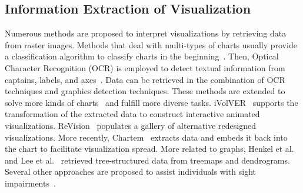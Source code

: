\subsection{Information Extraction of Visualization}
Numerous methods are proposed to interpret visualizations by retrieving data from raster images.
Methods that deal with multi-types of charts usually provide a classification algorithm to classify charts in the beginning~\cite{DBLP:conf/icip/GaoZB12, DBLP:conf/chi/JungKSHLKS17, DBLP:conf/eccv/SiegelHLDF16, DBLP:journals/vlc/DaiWNZ18}.
Then, Optical Character Recognition (OCR) is employed to detect textual information from captains, labels, and axes~\cite{DBLP:conf/icip/ZhouT00, DBLP:conf/doceng/HuangT07, DBLP:conf/grec/HuangTL03}.
Data can be retrieved in the combination of OCR techniques and graphics detection techniques.
These methods are extended to solve more kinds of charts~\cite{DBLP:conf/pkdd/ClicheRMY17, DBLP:conf/uist/SavvaKCFAH11} and fulfill more diverse tasks.
iVolVER~\cite{DBLP:conf/chi/MendezNV16} supports the transformation of the extracted data to construct interactive animated visualizations.
ReVision~\cite{DBLP:conf/uist/SavvaKCFAH11} populates a gallery of alternative redesigned visualizations.
More recently, Chartem~\cite{DBLP:journals/tvcg/FuZCGWZHTZM21} extracts data and embeds it back into the chart to facilitate visualization spread.
More related to graphs, Henkel et al.~\cite{DBLP:conf/vmv/HenkelKLG20} and Lee et al.~\cite{DBLP:conf/icdar/LeeYWH17} retrieved tree-structured data from treemaps and dendrograms.
Several other approaches are proposed to assist individuals with sight impairments~\cite{DBLP:conf/ismis/ChesterE05, DBLP:journals/tiis/CarberrySMDWGCSOM12, DBLP:journals/cgf/ChoiJPCE19}.

